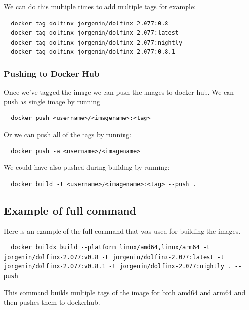\documentclass[final]{article}
\numberwithin{equation}{section}
\theoremstyle{remarkStyle}
\begin{document}
We can do this multiple times to add multiple tags for example:
\begin{lstlisting}
  docker tag dolfinx jorgenin/dolfinx-2.077:0.8
  docker tag dolfinx jorgenin/dolfinx-2.077:latest
  docker tag dolfinx jorgenin/dolfinx-2.077:nightly
  docker tag dolfinx jorgenin/dolfinx-2.077:0.8.1
\end{lstlisting}

\subsubsection{Pushing to Docker Hub}
Once we've tagged the image we can push the images to docker hub.
We can push as single image by running
\begin{lstlisting}
  docker push <username>/<imagename>:<tag>
\end{lstlisting}

Or we can push all of the tags by running:
\begin{lstlisting}
  docker push -a <username>/<imagename>
\end{lstlisting}

We could have also pushed during building by running:
\begin{lstlisting}
  docker build -t <username>/<imagename>:<tag> --push .
\end{lstlisting}

\subsection{Example of full command}

Here is an example of the full command that was used for building the  images.

\begin{lstlisting}
  docker buildx build --platform linux/amd64,linux/arm64 -t jorgenin/dolfinx-2.077:v0.8 -t jorgenin/dolfinx-2.077:latest -t jorgenin/dolfinx-2.077:v0.8.1 -t jorgenin/dolfinx-2.077:nightly . --push
\end{lstlisting}

This command builds multiple tags of the image for both amd64 and arm64 and then pushes them to dockerhub.
\end{document}
